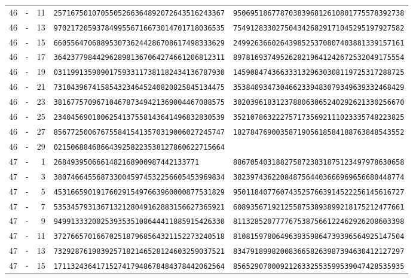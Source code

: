 \begin{longtable}{@{}rcrll@{}}
46&-&11&\texttt{2571675010705505266364892072643516243367}&\texttt{9506951867787038396812610801775578392738}\\
46&-&13&\texttt{9702172059378499556716673014701718036535}&\texttt{7549128330275043426829171045295197927582}\\
46&-&15&\texttt{6605564706889530736244286708617498333629}&\texttt{2499263660264398525370807403881339157161}\\
46&-&17&\texttt{3642377984429628981367064274661206812311}&\texttt{8978169374952628219641242672532049175554}\\
46&-&19&\texttt{0311991359090175933117381182434136787930}&\texttt{1459084743663331329630308119725317288725}\\
46&-&21&\texttt{7310439674158543234645240820825845134475}&\texttt{3538409347304662339483079349639332468429}\\
46&-&23&\texttt{3816775709671046787349421369004467088575}&\texttt{3020396183123788063065240292621330256670}\\
46&-&25&\texttt{2340456901006254137558143641496832830539}&\texttt{3521078632227571735692111023335748223825}\\
46&-&27&\texttt{8567725006767558415413570319006027245747}&\texttt{1827847690035871905618584188763848543552}\\
46&-&29&\texttt{0215068846866439258223538127860622715664}&\texttt{}\\
47&-&1&\texttt{2684939506661482168900987442133771}&\texttt{8867054031882758723831875123497978630658}\\
47&-&3&\texttt{3807466455687330045974532256605453969834}&\texttt{3823974362208487564403666969656680448774}\\
47&-&5&\texttt{4531665901917602915497663960000877531829}&\texttt{9501184077607435257663914522256145616727}\\
47&-&7&\texttt{5353457931367132128049162883156627365921}&\texttt{6089356719212558753893899218175212477661}\\
47&-&9&\texttt{9499133320025393535108644411885915426330}&\texttt{8113285207777675387566122462926208603398}\\
47&-&11&\texttt{3727665701667025187968564321152273240518}&\texttt{8108159780649639359864739396564925147504}\\
47&-&13&\texttt{7329287619839257182146528124603259037521}&\texttt{8347918998200836658263987394630412127297}\\
47&-&15&\texttt{1711324364171527417948678484378442062564}&\texttt{8565290700092126332553599539047428535935}\\

\end{longtable}
